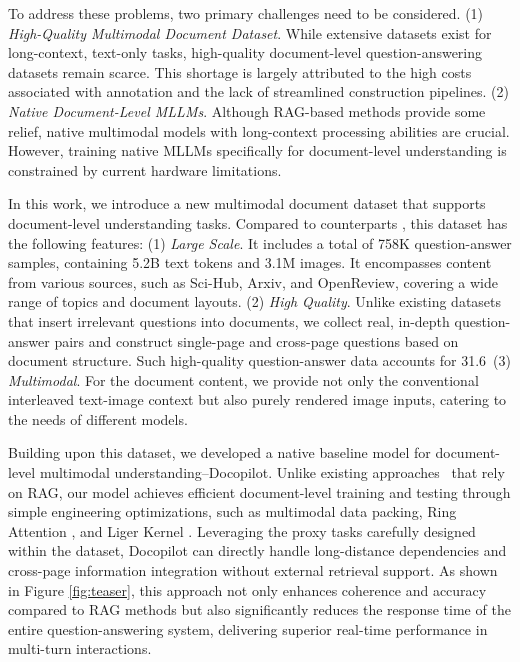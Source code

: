 \documentclass[10pt,twocolumn,letterpaper]{article}
\def\modelname{Docopilot\xspace}
\begin{document}
\begin{CJK}{UTF8}{gbsn}
To address these problems, two primary challenges need to be considered.
(1) \emph{High-Quality Multimodal Document Dataset}. While extensive datasets \cite{chen2023longlora, yang2023longqlora, zhang2024longreward, zhang2024longcite} exist for long-context, text-only tasks, high-quality document-level question-answering datasets remain scarce. This shortage is largely attributed to the high costs associated with annotation and the lack of streamlined construction pipelines.
(2) \emph{Native Document-Level MLLMs}. Although RAG-based methods \cite{yu2024visrag, cho2024m3docrag, wang2024mmniah} provide some relief, native multimodal models with long-context processing abilities are crucial. However, training native MLLMs specifically for document-level understanding is constrained by current hardware limitations.

In this work, we introduce a new multimodal document dataset that supports document-level understanding tasks. Compared to counterparts \cite{van2023document, laurenccon2024docmatix, tito2023mpdocvqa}, this dataset has the following features:
(1) \emph{Large Scale}. It includes a total of 758K question-answer samples, containing 5.2B text tokens and 3.1M images. It encompasses content from various sources, such as Sci-Hub, Arxiv, and OpenReview, covering a wide range of topics and document layouts.
(2) \emph{High Quality}. Unlike existing datasets that insert irrelevant questions into documents, we collect real, in-depth question-answer pairs and construct single-page and cross-page questions based on document structure. Such high-quality question-answer data accounts for 31.6\
(3) \emph{Multimodal}. For the document content, we provide not only the conventional interleaved text-image context but also purely rendered image inputs, catering to the needs of different models.


Building upon this dataset, we developed a native baseline model for document-level multimodal understanding--\modelname.
Unlike existing approaches~\cite{yu2024visrag, cho2024m3docrag, wang2024mmniah} that rely on RAG, our model achieves efficient document-level training and testing through simple engineering optimizations, such as multimodal data packing, Ring Attention \cite{liu2023ring}, and Liger Kernel \cite{dai2024ligerkernel}.
Leveraging the proxy tasks carefully designed within the dataset, \modelname can directly handle long-distance dependencies and cross-page information integration without external retrieval support.
As shown in Figure \ref{fig:teaser}, this approach not only enhances coherence and accuracy compared to RAG methods but also significantly reduces the response time of the entire question-answering system, delivering superior real-time performance in multi-turn interactions.


\end{CJK}
\end{document}
